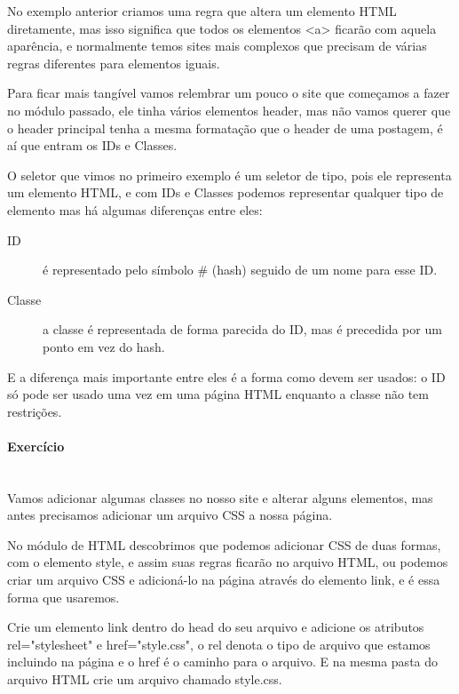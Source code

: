 \documentclass[12pt,a4paper]{article}
\begin{document}
	No exemplo anterior criamos uma regra que altera um elemento HTML diretamente, mas isso significa que todos os elementos <a> ficarão com aquela aparência, e normalmente temos sites mais complexos que precisam de várias regras diferentes para elementos iguais.
	
	Para ficar mais tangível vamos relembrar um pouco o site que começamos a fazer no módulo passado, ele tinha vários elementos header, mas não vamos querer que o header principal tenha a mesma formatação que o header de uma postagem, é aí que entram os IDs e Classes.
	
	O seletor que vimos no primeiro exemplo é um seletor de tipo, pois ele representa um elemento HTML, e com IDs e Classes podemos representar qualquer tipo de elemento mas há algumas diferenças entre eles:
	
	\begin{description}
		\item[ID] é representado pelo símbolo \# (hash) seguido de um nome para esse ID.
		
		\item[Classe] a classe é representada de forma parecida do ID, mas é precedida por um ponto em vez do hash.
	\end{description} 
	
	E a diferença mais importante entre eles é a forma como devem ser usados: o ID só pode ser usado uma vez em uma página HTML enquanto a classe não tem restrições.
	
	\paragraph{Exercício} \mbox{} \\
	
	Vamos adicionar algumas classes no nosso site e alterar alguns elementos, mas antes precisamos adicionar um arquivo CSS a nossa página.
	
	No módulo de HTML descobrimos que podemos adicionar CSS de duas formas, com o elemento style, e assim suas regras ficarão no arquivo HTML, ou podemos criar um arquivo CSS e adicioná-lo na página através do elemento link, e é essa forma que usaremos.
	
	Crie um elemento link dentro do head do seu arquivo e adicione os atributos rel="stylesheet" e href="style.css", o rel denota o tipo de arquivo que estamos incluindo na página e o href é o caminho para o arquivo. E na mesma pasta do arquivo HTML crie um arquivo chamado style.css.
	
\end{document}
